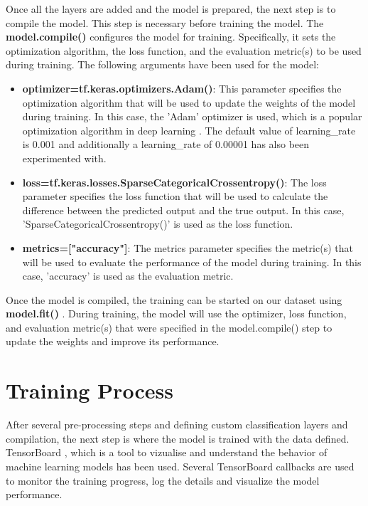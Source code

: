 Once all the layers are added and the model is prepared, the next step is to compile the model. This step is necessary before training the model. The \textbf{model.compile()} \cite{tensorflowTfkerasModelTensorFlow} configures the model for training. Specifically, it sets the optimization algorithm, the loss function, and the evaluation metric(s) to be used during training. The following arguments have been used for the model:
\begin{itemize}
    \item \textbf{optimizer=tf.keras.optimizers.Adam()}: This parameter specifies the optimization algorithm that will be used to update the weights of the model during training. In this case, the 'Adam' optimizer is used, which is a popular optimization algorithm in deep learning \cite{kingma2014adam}. The default value of learning\_rate is 0.001 \cite{tensorflowTfkerasoptimizersAdamTensorFlow} and additionally a learning\_rate of 0.00001 has also been experimented with. 
    \item \textbf{loss=tf.keras.losses.SparseCategoricalCrossentropy()}: The loss parameter specifies the loss function that will be used to calculate the difference between the predicted output and the true output. In this case, 'SparseCategoricalCrossentropy()' is used as the loss function.
    \item \textbf{metrics=["accuracy"]}: The metrics parameter specifies the metric(s) that will be used to evaluate the performance of the model during training. In this case, 'accuracy' is used as the evaluation metric.
\end{itemize}

Once the model is compiled, the training can be started on our dataset using \textbf{model.fit()} \cite{tensorflowTfkerasModelTensorFlows}. During training, the model will use the optimizer, loss function, and evaluation metric(s) that were specified in the model.compile() step to update the weights and improve its performance.  


\section{Training Process}

After several pre-processing steps and defining custom classification layers and compilation, the next step is where the model is trained with the data defined. TensorBoard \cite{tensorflowTensorBoardTensorFlow}, which is a tool to vizualise and understand the behavior of machine learning models has been used. Several TensorBoard callbacks are used \cite{tensorflowTfkerascallbacksTensorBoardTensorFlow} to monitor the training progress, log the details and visualize the model performance. 


